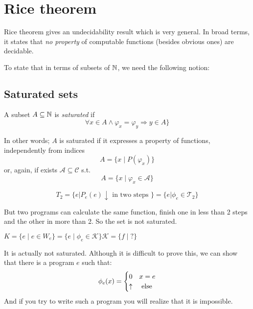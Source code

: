 \chapter {Rice theorem}

Rice theorem gives an undecidability result which is very general. In broad
terms, it states that \emph{no property} of computable functions
(besides obvious ones) are decidable.

To state that in terms of subsets of $\mathbb{N}$, we need the following
notion:

\section{Saturated sets}
\begin{definition}
  A subset $A \subseteq \mathbb{N}$ is \emph{saturated} if
  \[
    \forall x \in A \wedge \varphi_x = \varphi_y \Rightarrow y \in A \}
  \]
\end{definition}

In other words; $A$ is saturated if it expresses a property of
functions, independently from indices
\[A = \{x \mid P(\varphi_x)\}\]
or, again, if exists $\mathcal{A} \subseteq \mathcal{C}$ s.t.
\[A = \{ x \mid \varphi_x \in \mathcal{A}\}\]

\begin{example}
  \[
    T_2 = \{ e | P_e(e)\downarrow \mbox{ in two steps } \} =
    \{e|\phi_e \in \mathcal{T}_2 \}
  \]

  But two programs can calculate the same function, finish one in
  less than 2 steps and the other in more than 2. So the set is not
  saturated.
\end{example}

\begin{example}
  
  \begin{center}
    $ K = \{e \mid e\in W_e \} = \{e \mid \phi_e\in \mathcal{K} \}
  \mathcal{K} = \{f \mid ? \}$
  \end{center}

  It is actually not saturated. Although it is difficult to prove this, 
  we can show that there is a program $e$ such that:
  \begin{equation*}
    \phi_e(x) = \begin{cases}
      0 & x = e \\
      \uparrow & $ else $
    \end{cases}
  \end{equation*}
  And if you try to write such a program you will realize that it is
  impossible.
\end{example}

